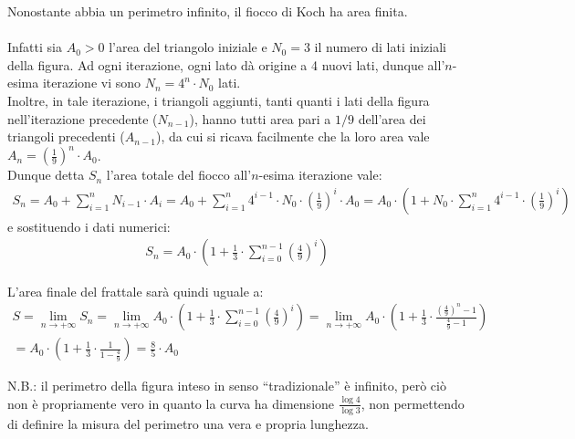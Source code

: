 \documentclass[10pt]{report}
\begin{document}
			Nonostante abbia un perimetro infinito, il fiocco di Koch ha area finita. \\\\
			Infatti sia $A_0 > 0$ l'area del triangolo iniziale e $N_0 = 3$ il numero di lati iniziali della figura. Ad ogni iterazione, ogni lato dà origine a 4 nuovi lati, dunque all'$n$-esima iterazione vi sono $N_n = 4^n \cdot N_0$ lati. \\Inoltre, in tale iterazione, i triangoli aggiunti, tanti quanti i lati della figura nell'iterazione precedente ($N_{n-1}$), hanno tutti area pari a $1/9$ dell'area dei triangoli precedenti ($A_{n-1}$), da cui si ricava facilmente che la loro area vale $A_n = \left( \frac{1}{9} \right) ^ n \cdot A_0$.\\
			Dunque detta $S_n$ l'area totale del fiocco all'$n$-esima iterazione vale:
			\begin{gather*}
				S_n = A_0 + \sum_{i=1}^{n} N_{i-1} \cdot A_{i} = 
		        A_0 + \sum_{i=1}^{n} 4^{i-1} \cdot N_0 \cdot \left( \frac{1}{9} \right) ^ i \cdot A_0 =
		        A_0 \cdot \left( 1 + N_0 \cdot \sum_{i=1}^{n} 4^{i-1} \cdot \left( \frac{1}{9} \right) ^ i  \right)
			\end{gather*}
			e sostituendo i dati numerici:
			\begin{gather*}
				S_n = A_0 \cdot \left( 1 + \frac{1}{3} \cdot \sum_{i=0}^{n-1} \left(\frac{4}{9}\right)^i \right) 
			\end{gather*} 
		
			L'area finale del frattale sarà quindi uguale a:
			\begin{gather*}
				S = \lim_{n \to +\infty} S_n = \lim_{n \to +\infty} A_0 \cdot \left( 1 + \frac{1}{3} \cdot \sum_{i=0}^{n-1} \left(\frac{4}{9}\right)^i \right) = \lim_{n \to +\infty} A_0 \cdot \left(1 + \frac{1}{3} \cdot \frac{ \left( \frac{4}{9} \right) ^ n - 1}{\frac{4}{9} - 1} \right) \\
				= A_0 \cdot \left(1 + \frac{1}{3} \cdot \frac{1}{1 - \frac{4}{9}} \right) = \frac{8}{5} \cdot A_0
			\end{gather*}
			\begin{footnotesize}
				N.B.: il perimetro della figura inteso in senso ``tradizionale'' è infinito, però ciò non è propriamente vero in quanto la curva ha dimensione $\frac{\log 4}{\log 3}$, non permettendo di definire la misura del perimetro una vera e propria lunghezza.
			\end{footnotesize}
		
\end{document}
